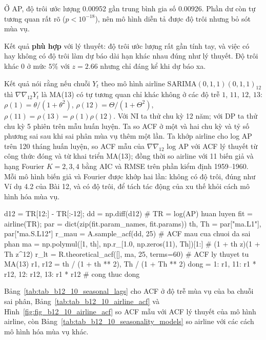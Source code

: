 Ở AP, độ trôi ước lượng 0.00952 gần trung bình gia số 0.00926. Phần dư còn tự tương quan rất rõ ($p<10^{-18}$), nên mô hình diễn tả được độ trôi nhưng bỏ sót mùa vụ.

 Kết quả \textbf{phù hợp} với lý thuyết: độ trôi ước lượng rất gần tính tay, và việc có hay không có độ trôi làm dự báo dài hạn khác nhau đúng như lý thuyết. Độ trôi khác $0$ ở mức $5\%$ với $z=2.66$ nhưng chỉ đáng kể khi dự báo xa.

 Kết quả  nói rằng nếu chuỗi $Y_t$ theo mô hình airline SARIMA$(0,1,1)(0,1,1)_{12}$ thì $\nabla\nabla_{12}Y_t$ là MA(13) có tự tương quan chỉ khác không ở các độ trễ $1$, $11$, $12$, $13$: $\rho(1)=\theta/(1+\theta^2)$, $\rho(12)=\Theta/(1+\Theta^2)$, $\rho(11)=\rho(13)=\rho(1)\rho(12)$.
 Với NI ta thử chu kỳ 12 năm; với DP ta thử chu kỳ 5 phiên trên mẫu huấn luyện. Ta so ACF ở một và hai chu kỳ và tỷ số phương sai sau khi sai phân mùa vụ thêm một lần. Ta khớp airline cho log AP trên 120 tháng huấn luyện, so ACF mẫu của $\nabla\nabla_{12}$ log AP với ACF lý thuyết từ công thức đóng và từ khai triển MA(13); đồng thời so airline với 11 biến giả và hạng Fourier $K=2,3,4$ bằng AIC và RMSE trên phần kiểm định 1959--1960. Mỗi mô hình biến giả và Fourier được khớp hai lần: không có độ trôi, đúng như Ví dụ 4.2 của Bài 12, và có độ trôi, để tách tác động của xu thế khỏi cách mô hình hóa mùa vụ.
\begin{codeblock}
d12 = TR[12:] - TR[:-12]; dd = np.diff(d12)                    # TR = log(AP) huan luyen
fit = airline(TR); par = dict(zip(fit.param_names, fit.params))
th, Th = par["ma.L1"], par["ma.S.L12"]
r_mau = A.sample_acf(dd, 25)                           # ACF mau cua chuoi da sai phan
ma = np.polymul([1, th], np.r_[1.0, np.zeros(11), Th])[1:]     # (1 + th z)(1 + Th z^12)
r_lt = R.theoretical_acf([], ma, 25, terms=60)          # ACF ly thuyet tu MA(13)
r1, r12 = th / (1 + th ** 2), Th / (1 + Th ** 2)
dong = {1: r1, 11: r1 * r12, 12: r12, 13: r1 * r12}     # cong thuc dong
\end{codeblock}
 Bảng~\ref{tab:tab_b12_10_seasonal_lags} cho ACF ở độ trễ mùa vụ của ba chuỗi sai phân, Bảng~\ref{tab:tab_b12_10_airline_acf} và Hình~\ref{fig:fig_b12_10_airline_acf} so ACF mẫu với ACF lý thuyết của mô hình airline, còn Bảng~\ref{tab:tab_b12_10_seasonality_models} so airline với các cách mô hình hóa mùa vụ khác.


